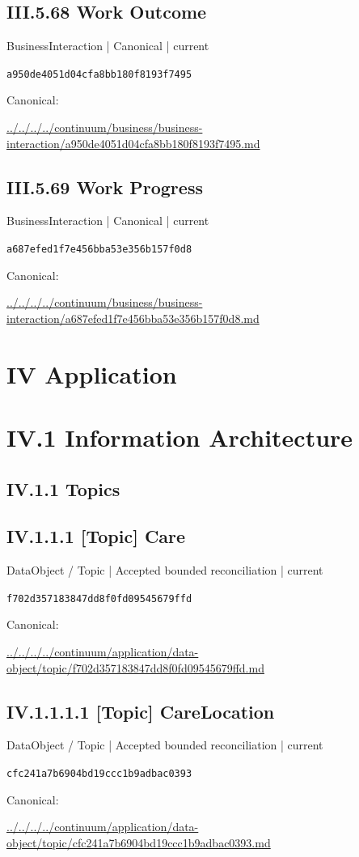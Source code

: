 \documentclass[10pt,a4paper]{article}
\begin{document}
\subsection*{III.5.68 Work Outcome}
\label{element-a950de4051d04cfa8bb180f8193f7495}
{\small BusinessInteraction | Canonical | current}\par
\texttt{a950de4051d04cfa8bb180f8193f7495}\par
Canonical: \par
{\footnotesize\url{../../../../continuum/business/business-interaction/a950de4051d04cfa8bb180f8193f7495.md}}\par
\subsection*{III.5.69 Work Progress}
\label{element-a687efed1f7e456bba53e356b157f0d8}
{\small BusinessInteraction | Canonical | current}\par
\texttt{a687efed1f7e456bba53e356b157f0d8}\par
Canonical: \par
{\footnotesize\url{../../../../continuum/business/business-interaction/a687efed1f7e456bba53e356b157f0d8.md}}\par
\section*{IV Application}
\section*{IV.1 Information Architecture}
\subsection*{IV.1.1 Topics}
\subsection*{IV.1.1.1 [Topic] Care}
\label{element-f702d357183847dd8f0fd09545679ffd}
{\small DataObject / Topic | Accepted bounded reconciliation | current}\par
\texttt{f702d357183847dd8f0fd09545679ffd}\par
Canonical: \par
{\footnotesize\url{../../../../continuum/application/data-object/topic/f702d357183847dd8f0fd09545679ffd.md}}\par
\subsection*{IV.1.1.1.1 [Topic] CareLocation}
\label{element-cfc241a7b6904bd19ccc1b9adbac0393}
{\small DataObject / Topic | Accepted bounded reconciliation | current}\par
\texttt{cfc241a7b6904bd19ccc1b9adbac0393}\par
Canonical: \par
{\footnotesize\url{../../../../continuum/application/data-object/topic/cfc241a7b6904bd19ccc1b9adbac0393.md}}\par
\end{document}
